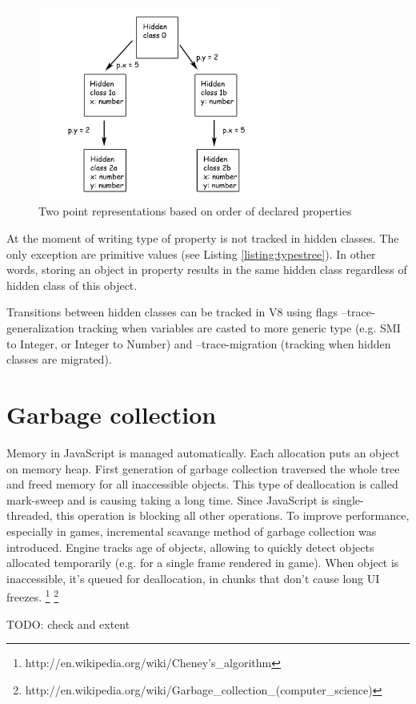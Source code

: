 \begin{figure}[h!]
  \caption{Two point representations based on order of declared properties}
  \label{img:point_tree2}
  \centering
	\includegraphics[width=8cm]{point_tree2}
\end{figure} 

At the moment of writing type of property is not tracked in hidden classes. The only exception are primitive values (see Listing \ref{listing:typestree}). In other words, storing an object in property results in the same hidden class regardless of hidden class of this object.

Transitions between hidden classes can be tracked in V8 using flags --trace-generalization tracking when variables are casted to more generic type (e.g. SMI to Integer, or Integer to Number) and --trace-migration (tracking when hidden classes are migrated).



\section{Garbage collection}
\label{sec:garbagecollection}

Memory in JavaScript is managed automatically. Each allocation puts an object on memory heap. First generation of garbage collection traversed the whole tree and freed memory for all inaccessible objects. This type of deallocation is called mark-sweep and is causing taking a long time. Since JavaScript is single-threaded, this operation is blocking all other operations. To improve performance, especially in games, incremental scavange method of garbage collection was introduced. Engine tracks age of objects, allowing to quickly detect objects allocated temporarily (e.g. for a single frame rendered in game). When object is inaccessible, it's queued for deallocation, in chunks that don't cause long UI freezes. \footnote{http://en.wikipedia.org/wiki/Cheney's\_algorithm} \footnote{http://en.wikipedia.org/wiki/Garbage\_collection\_(computer\_science)}

TODO: check and extent


